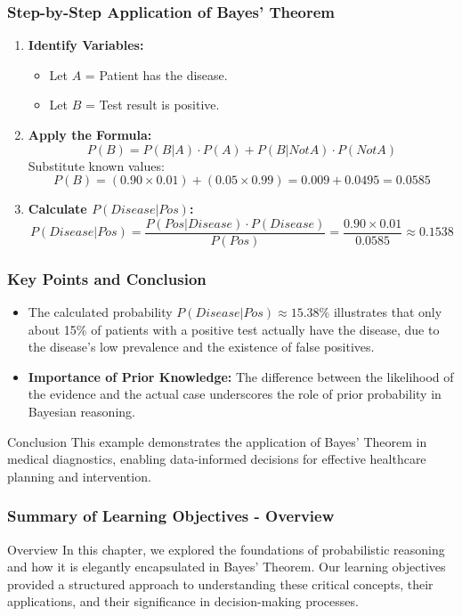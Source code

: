 \documentclass[aspectratio=169]{beamer}
\begin{document}
\begin{frame}[fragile]
    \frametitle{Step-by-Step Application of Bayes' Theorem}
    \begin{enumerate}
        \item \textbf{Identify Variables:}
            \begin{itemize}
                \item Let \(A\) = Patient has the disease.
                \item Let \(B\) = Test result is positive.
            \end{itemize}

        \item \textbf{Apply the Formula:}
            \[
            P(B) = P(B|A) \cdot P(A) + P(B|Not A) \cdot P(Not A)
            \]
            Substitute known values:
            \[
            P(B) = (0.90 \times 0.01) + (0.05 \times 0.99) = 0.009 + 0.0495 = 0.0585
            \]

        \item \textbf{Calculate \(P(Disease|Pos)\):}
            \[
            P(Disease|Pos) = \frac{P(Pos|Disease) \cdot P(Disease)}{P(Pos)} = \frac{0.90 \times 0.01}{0.0585} \approx 0.1538
            \]
    \end{enumerate}
\end{frame}

\begin{frame}[fragile]
    \frametitle{Key Points and Conclusion}
    \begin{itemize}
        \item The calculated probability \(P(Disease|Pos) \approx 15.38\%\) illustrates that only about 15\% of patients with a positive test actually have the disease, due to the disease's low prevalence and the existence of false positives.
        \item \textbf{Importance of Prior Knowledge:} The difference between the likelihood of the evidence and the actual case underscores the role of prior probability in Bayesian reasoning.
    \end{itemize}
    \begin{block}{Conclusion}
        This example demonstrates the application of Bayes' Theorem in medical diagnostics, enabling data-informed decisions for effective healthcare planning and intervention.
    \end{block}
\end{frame}

\begin{frame}[fragile]
    \frametitle{Summary of Learning Objectives - Overview}
    \begin{block}{Overview}
        In this chapter, we explored the foundations of probabilistic reasoning and how it is elegantly encapsulated in Bayes' Theorem. Our learning objectives provided a structured approach to understanding these critical concepts, their applications, and their significance in decision-making processes.
    \end{block}
\end{frame}
\end{document}
